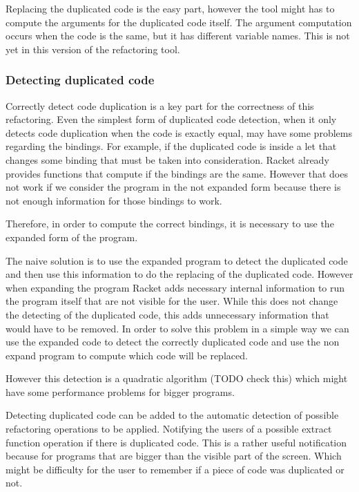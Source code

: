 Replacing the duplicated code is the easy part, however the tool might has to compute %
the arguments for the duplicated code itself. The argument computation occurs when
the code is the same, but it has different variable names. This is not yet in this
version of the refactoring tool. %

\subsubsection{Detecting duplicated code}
Correctly detect code duplication is a key part for the correctness of this refactoring.
Even the simplest form of duplicated code detection, when it only detects code duplication
when the code is exactly equal, may have some problems regarding the bindings.
For example, if the duplicated code is inside a let that changes some binding that must
be taken into consideration.
Racket already provides functions that compute if the bindings are the same.
However that does not work if we consider the program in the not expanded
form because there is not enough information for those bindings to work. %


Therefore, in order to compute the correct bindings, it is necessary to use the expanded form
of the program.

The naive solution is to use the expanded program to detect the duplicated
 code and then use this information to do the replacing of the duplicated code.
However when expanding the program Racket adds necessary internal information to
run the program itself that are not visible for the user.
While this does not change the detecting of the duplicated code, this adds unnecessary information
that would have to be removed. %
In order to solve this problem in a simple way we can use the expanded code to detect
the correctly duplicated code and use the non expand program
to compute which code will be replaced.

However this detection is a quadratic algorithm (TODO check this) which might
have some performance problems for bigger programs. %

Detecting duplicated code can be added to the automatic detection of possible refactoring operations to be applied. %
Notifying the users of a possible extract function operation if there is duplicated code.
This is a rather useful notification because for programs that are bigger than the
visible part of the screen.
Which might be difficulty for the user to remember if a piece of code was duplicated or not.


